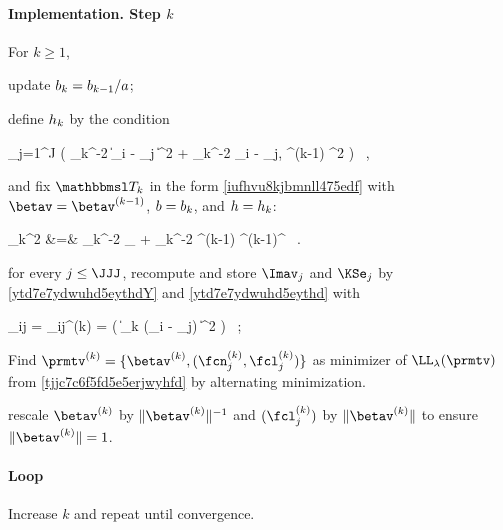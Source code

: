 \paragraph{Implementation. Step \( k \)}
For \( k \geq 1 \), 
\begin{mylist}

\item 
update \( b_{k} = b_{k-1} / a \);
\item 
define \( h_{k} \) by the condition
\begin{EQA}[c]
	 \sum_{j=1}^{J} \sumi 
		\Kern\bigl( \hiso_{k}^{-2} \| \Xv_{i} - \xv_{j} \|^{2} + \haniso_{k}^{-2} \langle \Xv_{i} - \xv_{j}, \betav^{(k-1)} \rangle^{2} \bigr)
	\geq 
	\nmin
	\, ,
\label{jhgiverkytde4w34etycja}
\end{EQA}
and fix \( \TEDR_{k} \) in the form \eqref{iufhvu8kjbmnll475edf} with \( \betav = \betav^{(k-1)} \),
\( b = b_{k} \), and \( h = h_{k} \):
\begin{EQA}[rcl]
	\TEDR_{k}^{2}
	&=&
	\hiso_{k}^{-2} \Id_{\dimd} + \haniso_{k}^{-2} \betav^{(k-1)} {\betav^{(k-1)}}^{\T}
	\, .
\label{iufhvu8kjbmnll475edfk}
\end{EQA}

\item 
for every \( j \leq \JJJ \), recompute and store \( \Imav_{j} \) and \( \KSe_{j} \) by \eqref{ytd7e7ydwuhd5eythdY} and \eqref{ytd7e7ydwuhd5eythd}
with 
\begin{EQA}[c]
	\weight_{ij} 
	= 
	\weight_{ij}^{(k)}
	= 
	\Kern\bigl( \| \TEDR_{k} (\Xv_{i} - \xv_{j}) \|^{2} \bigr) 
	\, ;
\end{EQA}

\item 
Find \( \prmtv^{(k)} = \{ \betav^{(k)},(\fcn_{j}^{(k)},\fcl_{j}^{(k)}) \} \) as minimizer of 
\( \LL_{\lambda}(\prmtv) \) from \eqref{tjjc7c6f5fd5e5erjwyhfd} 
 by alternating minimization.
\item 
rescale \( \betav^{(k)} \) by \( \| \betav^{(k)} \|^{-1} \) and \( (\fcl_{j}^{(k)}) \) by \( \| \betav^{(k)} \| \) to ensure 
\( \| \betav^{(k)} \| = 1 \).
\end{mylist}


\paragraph{Loop}
%
Increase \( k \) and repeat until convergence.

